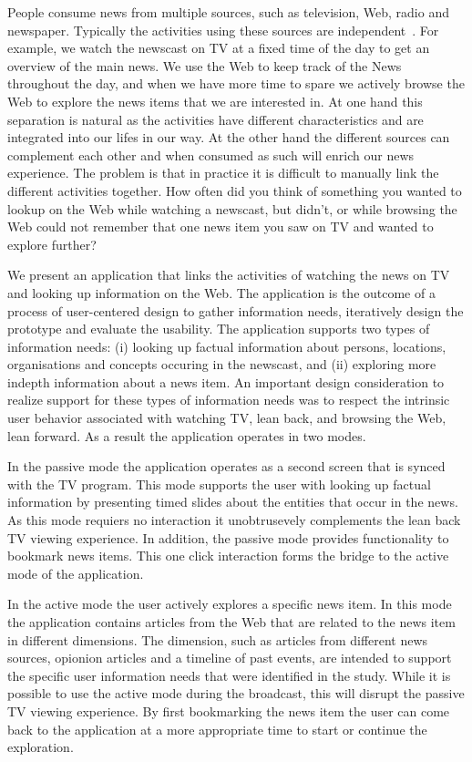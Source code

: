 \documentclass{llncs}
\begin{document}
People consume news from multiple sources, such as television, Web, radio and newspaper. Typically the activities using these sources are independent~\cite{}. For example, we watch the newscast on TV at a fixed time of the day to get an overview of the main news. We use the Web to keep track of the News throughout the day, and when we have more time to spare we actively browse the Web to explore the news items that we are interested in. At one hand this separation is natural as the activities have different characteristics and are integrated into our lifes in our way. At the other hand the different sources can complement each other and when consumed as such will enrich our news experience. The problem is that in practice it is difficult to manually link the different activities together. How often did you think of something you wanted to lookup on the Web while watching a newscast, but didn't, or while browsing the Web could not remember that one news item you saw on TV and wanted to explore further? 

We present an application that links the activities of watching the news on TV and looking up information on the Web. The application is the outcome of a process of user-centered design to gather information needs, iteratively design the prototype and evaluate the usability. The application supports two types of information needs: (i) looking up factual information about persons, locations, organisations and concepts occuring in the newscast, and (ii) exploring more indepth information about a news item. An important design consideration to realize support for these types of information needs was to respect the intrinsic user behavior associated with watching TV, lean back, and browsing the Web, lean forward. As a result the application operates in two modes. 

In the passive mode the application operates as a second screen that is synced with the TV program. This mode supports the user with looking up factual information by presenting timed slides about the entities that occur in the news. As this mode requiers no interaction it unobtrusevely complements the lean back TV viewing experience. In addition, the passive mode provides functionality to bookmark news items. This one click interaction forms the bridge to the active mode of the application. 

In the active mode the user actively explores a specific news item. In this mode the application contains articles from the Web that are related to the news item in different dimensions. The dimension, such as articles from different news sources, opionion articles and a timeline of past events, are intended to support the specific user information needs that were identified in the study. While it is possible to use the active mode during the broadcast, this will disrupt the passive TV viewing experience. By first bookmarking the news item the user can come back to the application at a more appropriate time to start or continue the exploration.
\end{document}
